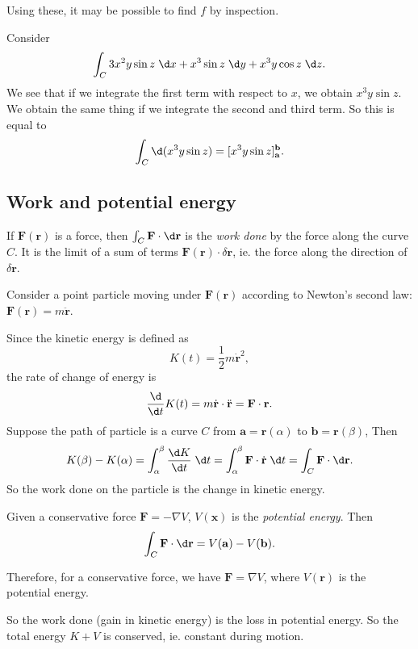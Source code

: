 \documentclass[a4paper]{article}
\begin{document}
Using these, it may be possible to find $f$ by inspection.

\begin{eg}
  Consider
  \[
    \int_C 3x^2 y\sin z\;\d x + x^3 \sin z \;\d y + x^3 y\cos z\;\d z.
  \]
  We see that if we integrate the first term with respect to $x$, we obtain $x^3 y\sin z$. We obtain the same thing if we integrate the second and third term. So this is equal to
  \[
    \int_C \d (x^3 y \sin z) = [x^3 y\sin z]^{\mathbf{b}}_{\mathbf{a}}.
  \]
\end{eg}

\subsection{Work and potential energy}
\begin{defi}
  If $\mathbf{F}(\mathbf{r})$ is a force, then $\int_C \mathbf{F}\cdot \d \mathbf{r}$ is the \emph{work done} by the force along the curve $C$. It is the limit of a sum of terms $\mathbf{F}(\mathbf{r})\cdot \delta \mathbf{r}$, ie. the force along the direction of $\delta \mathbf{r}$.
\end{defi}

Consider a point particle moving under $\mathbf{F}(\mathbf{r})$ according to Newton's second law: $\mathbf{F}(\mathbf{r}) = m\ddot{\mathbf{r}}$.

Since the kinetic energy is defined as
\[
  K(t) = \frac{1}{2}m\dot{\mathbf{r}}^2,
\]
the rate of change of energy is
\[
  \frac{\d}{\d t}K(t) = m\dot{\mathbf{r}}\cdot \ddot{\mathbf{r}} = \mathbf{F}\cdot \mathbf{r}.
\]
Suppose the path of particle is a curve $C$ from $\mathbf{a} = \mathbf{r}(\alpha)$ to $\mathbf{b} = \mathbf{r}(\beta)$, Then
\[
  K(\beta) - K(\alpha) = \int_\alpha^\beta \frac{\d K}{\d t} \;\d t = \int_\alpha^\beta \mathbf{F}\cdot \dot{\mathbf{r}}\;\d t = \int_C \mathbf{F}\cdot \d \mathbf{r}.
\]
So the work done on the particle is the change in kinetic energy.

\begin{defi}
  Given a conservative force $\mathbf{F} = -\nabla V$, $V(\mathbf{x})$ is the \emph{potential energy}. Then
  \[
    \int_C  \mathbf{F}\cdot \d \mathbf{r} = V(\mathbf{a}) - V(\mathbf{b}).
  \]
\end{defi}
Therefore, for a conservative force, we have $\mathbf{F} = \nabla V$, where $V(\mathbf{r})$ is the potential energy.

So the work done (gain in kinetic energy) is the loss in potential energy. So the total energy $K + V$ is conserved, ie. constant during motion.
\end{document}
